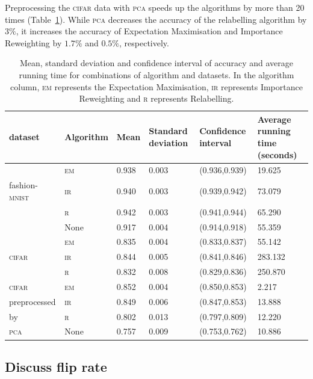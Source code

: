 \documentclass[12pt]{article} %
\newcommand{\mnist}{fashion-\textsc{mnist}}
\begin{document}
Preprocessing the \textsc{cifar} data with \textsc{pca} speeds up the algorithms by more than 20 times (Table~\ref{tab:Meansd}). While  \textsc{pca} decreases the accuracy of the relabelling algorithm by $3\%$, it increases the accuracy of Expectation Maximisation and Importance Reweighting  by $1.7\%$ and $0.5\%$, respectively. 
\begin{table}
	\caption{Mean, standard deviation and confidence interval of accuracy and average running time for combinations of algorithm and datasets. In the algorithm column, \textsc{em} represents the Expectation Maximisation, \textsc{ir} represents Importance Reweighting and \textsc{r} represents Relabelling. }
	\label{tab:Meansd}
\centering
\begin{tabular}{@{}llllll@{}}
\toprule
dataset& Algorithm&Mean  & Standard deviation & Confidence interval & Average running time (seconds) \\ \midrule
&\textsc{em}&0.938 & 0.003              & (0.936,0.939)     & 19.625\\
\mnist\ &\textsc{ir}&0.940  & 0.003              & (0.939,0.942)     & 73.079\\
&\textsc{r}&0.942 & 0.003              & (0.941,0.944)     & 65.290\\
&None &0.917 &0.004 & (0.914,0.918) & 55.359 \\
\midrule
&\textsc{em}&0.835 & 0.004              & (0.833,0.837)     & 55.142\\
\textsc{cifar}&\textsc{ir}&0.844 & 0.005              & (0.841,0.846)     & 283.132\\
  &\textsc{r}&0.832 & 0.008              & (0.829,0.836)     & 250.870\\ 
\midrule
\textsc{cifar}&\textsc{em}&0.852 & 0.004              & (0.850,0.853)     & 2.217\\
 preprocessed&\textsc{ir}& 0.849 & 0.006              & (0.847,0.853)     & 13.888\\
 by  &\textsc{r}& 0.802 & 0.013              & (0.797,0.809)     & 12.220\\ 
 \textsc{pca} &None &0.757 &0.009 &(0.753,0.762) &10.886 \\
\bottomrule
\end{tabular}
\end{table}



\subsection{Discuss flip rate}
\end{document}
